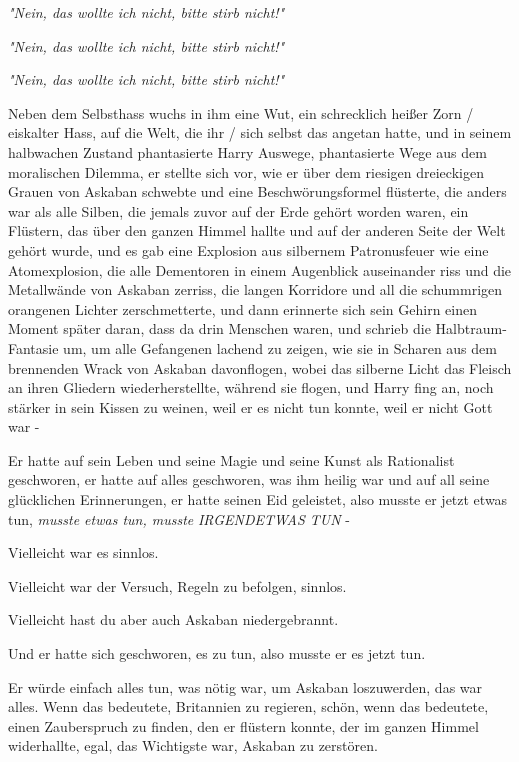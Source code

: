 {\emph{\emph{"Nein, das wollte ich nicht, bitte stirb nicht!"}}

\emph{\emph{"Nein, das wollte ich nicht, bitte stirb nicht!"}}

\emph{\emph{"Nein, das wollte ich nicht, bitte stirb nicht!"}}

Neben dem Selbsthass wuchs in ihm eine Wut, ein schrecklich heißer Zorn / eiskalter Hass, auf die Welt, die ihr / sich selbst das angetan hatte, und in seinem halbwachen Zustand phantasierte Harry Auswege, phantasierte Wege aus dem moralischen Dilemma, er stellte sich vor, wie er über dem riesigen dreieckigen Grauen von Askaban schwebte und eine Beschwörungsformel flüsterte, die anders war als alle Silben, die jemals zuvor auf der Erde gehört worden waren, ein Flüstern, das über den ganzen Himmel hallte und auf der anderen Seite der Welt gehört wurde, und es gab eine Explosion aus silbernem Patronusfeuer wie eine Atomexplosion, die alle Dementoren in einem Augenblick auseinander riss und die Metallwände von Askaban zerriss, die langen Korridore und all die schummrigen orangenen Lichter zerschmetterte, und dann erinnerte sich sein Gehirn einen Moment später daran, dass da drin Menschen waren, und schrieb die Halbtraum-Fantasie um, um alle Gefangenen lachend zu zeigen, wie sie in Scharen aus dem brennenden Wrack von Askaban davonflogen, wobei das silberne Licht das Fleisch an ihren Gliedern wiederherstellte, während sie flogen, und Harry fing an, noch stärker in sein Kissen zu weinen, weil er es nicht tun konnte, weil er nicht Gott war -

Er hatte auf sein Leben und seine Magie und seine Kunst als Rationalist geschworen, er hatte auf alles geschworen, was ihm heilig war und auf all seine glücklichen Erinnerungen, er hatte seinen Eid geleistet, also musste er jetzt etwas tun, \emph{musste etwas tun, musste} \emph{IRGENDETWAS TUN} -

Vielleicht war es sinnlos.

Vielleicht war der Versuch, Regeln zu befolgen, sinnlos.

Vielleicht hast du aber auch Askaban niedergebrannt.

Und er hatte sich geschworen, es zu tun, also musste er es jetzt tun.

Er würde einfach alles tun, was nötig war, um Askaban loszuwerden, das war alles. Wenn das bedeutete, Britannien zu regieren, schön, wenn das bedeutete, einen Zauberspruch zu finden, den er flüstern konnte, der im ganzen Himmel widerhallte, egal, das Wichtigste war, Askaban zu zerstören.

}
